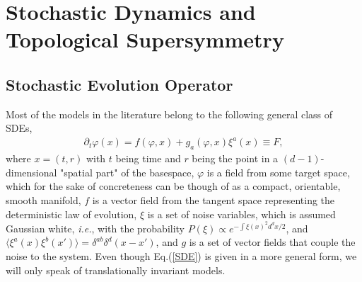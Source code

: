 \documentclass[final,5p,10pt,times,twocolumn,year]{elsarticle}
\begin{document}
\section{Stochastic Dynamics and Topological Supersymmetry}
\label{Sec:STS}
\subsection{Stochastic Evolution Operator}
Most of the models in the literature belong to the following general class of SDEs,
\begin{eqnarray}
    \partial_t \varphi(x) = f(\varphi,x) + g_a(\varphi,x)\xi^a(x) \equiv F,\label{SDE}
\end{eqnarray}
where $x=(t,r)$ with $t$ being time and $r$ being the point in a $(d-1)$-dimensional "spatial part" of the basespace, $\varphi$ is a field from some target space, which for the sake of concreteness can be though of as a compact, orientable, smooth manifold, $f$ is a vector field from the tangent space representing the deterministic law of evolution, $\xi$ is a set of noise variables, which is assumed Gaussian white, \emph{i.e.}, with the probability $P(\xi) \propto e^{-\int \xi(x)^2 d^{d}x/2}$, and $\langle\xi^a(x)\xi^b(x')\rangle=\delta^{ab}\delta^{d}(x-x')$, and $g$ is a set of vector fields that couple the noise to the system. Even though Eq.(\ref{SDE}) is given in a more general form, we will only speak of translationally invariant models. 
\end{document}
